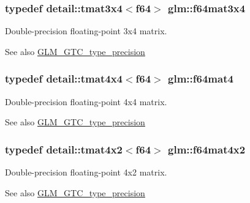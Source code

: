 \subsubsection[{f64mat3x4}]{\setlength{\rightskip}{0pt plus 5cm}typedef detail\+::tmat3x4$<$f64$>$ {\bf glm\+::f64mat3x4}}\label{group__gtc__type__precision_ga41bb7ff3c269ffae270d33acb3fcfae3}
Double-\/precision floating-\/point 3x4 matrix. \begin{DoxySeeAlso}{See also}
\hyperlink{group__gtc__type__precision}{G\+L\+M\+\_\+\+G\+T\+C\+\_\+type\+\_\+precision} 
\end{DoxySeeAlso}
\hypertarget{group__gtc__type__precision_ga20a9c8bd28f6eb7ad10574e5f9068145}{}
\subsubsection[{f64mat4}]{\setlength{\rightskip}{0pt plus 5cm}typedef detail\+::tmat4x4$<$f64$>$ {\bf glm\+::f64mat4}}\label{group__gtc__type__precision_ga20a9c8bd28f6eb7ad10574e5f9068145}
Double-\/precision floating-\/point 4x4 matrix. \begin{DoxySeeAlso}{See also}
\hyperlink{group__gtc__type__precision}{G\+L\+M\+\_\+\+G\+T\+C\+\_\+type\+\_\+precision} 
\end{DoxySeeAlso}
\hypertarget{group__gtc__type__precision_ga1097a920f29777c4220939e323377012}{}
\subsubsection[{f64mat4x2}]{\setlength{\rightskip}{0pt plus 5cm}typedef detail\+::tmat4x2$<$f64$>$ {\bf glm\+::f64mat4x2}}\label{group__gtc__type__precision_ga1097a920f29777c4220939e323377012}
Double-\/precision floating-\/point 4x2 matrix. \begin{DoxySeeAlso}{See also}
\hyperlink{group__gtc__type__precision}{G\+L\+M\+\_\+\+G\+T\+C\+\_\+type\+\_\+precision} 
\end{DoxySeeAlso}
\hypertarget{group__gtc__type__precision_gaa24e152ef6e17be752c350e495c879de}{}
